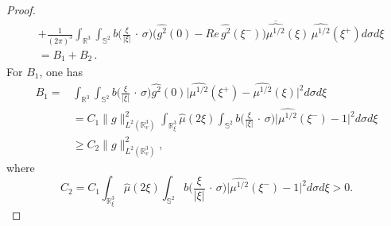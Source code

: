 \documentclass{amsart}[12pt, article]
\begin{document}
\begin{proof}
\begin{align*}
&+\frac{1}{(2\pi)^{3}} \int_{{{{\mathbb R}}}^{3}}\int_{\mathbb S^{2}}
b\Big(\frac{\xi}{|\xi|}
\,\cdot\,\sigma\Big)\Big(\widehat{g^2}(0)-Re\, \widehat{g^2}(\xi^-)\Big)
\overline{\widehat{\mu^{1/2}}}(\xi)\,
\widehat{\mu^{1/2}}(\xi^+) d\sigma d \xi \\
&=B_1+B_2\, .
\end{align*}
For $B_1$, one has
\begin{align*}
B_1=&\int_{{{{\mathbb R}}}^{3}}\int_{\mathbb S^{2}}
b\Big(\frac{\xi}{|\xi|}
\,\cdot\,\sigma\Big)\widehat{g^2}(0) \big|\widehat{\mu^{1/2}}(\xi^+)-
\widehat{\mu^{1/2}}(\xi)\big|^2 d\sigma d \xi\\
&=C_1\|g\|^2_{L^2({{{\mathbb R}}}^3_v)}\int_{{{{\mathbb R}}}^{3}_\xi}
\widehat{\mu}(2\xi)
\int_{\mathbb S^{2}}
b\Big(\frac{\xi}{|\xi|}
\,\cdot\,\sigma\Big) \big|\widehat{\mu^{1/2}}(\xi^-)
-1\big|^2 d\sigma d \xi\\
&\geq C_2 \|g\|^2_{L^2({{{\mathbb R}}}^3_v)},
\end{align*}
where
$$
C_2=C_1\int_{{{{\mathbb R}}}^{3}_\xi}
\widehat{\mu}(2\xi)
\int_{\mathbb S^{2}}
b\Big(\frac{\xi}{|\xi|}
\,\cdot\,\sigma\Big) \big|\widehat{\mu^{1/2}}(\xi^-)
-1\big|^2 d\sigma d \xi>0.
$$


\end{proof}
\end{document}
